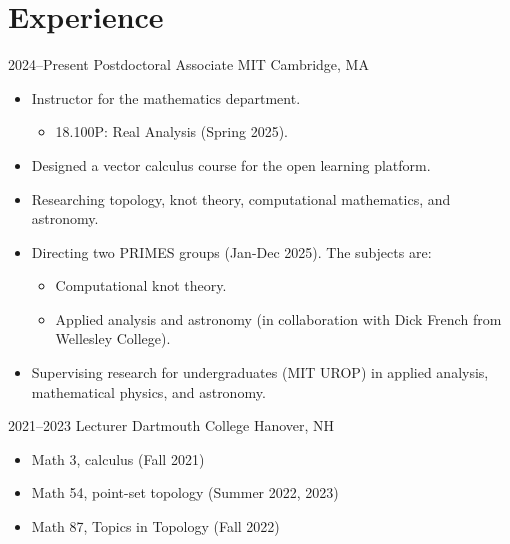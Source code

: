 \documentclass[a4paper,sans]{moderncv}
\begin{document}
    \section{Experience}
        \cventry%
            {2024--Present}
                {Postdoctoral Associate}
                {MIT}
                {Cambridge, MA}
                {}
                {%
                    \begin{itemize}
                        \item
                            Instructor for the mathematics department.
                            \begin{itemize}
                                \item
                                    18.100P: Real Analysis (Spring 2025).
                            \end{itemize}
                        \item
                            Designed a vector calculus course for the
                            open learning platform.
                        \item
                            Researching topology, knot theory,
                            computational mathematics, and astronomy.
                        \item
                            Directing two PRIMES groups (Jan-Dec 2025). The
                            subjects are:
                            \begin{itemize}
                                \item
                                    Computational knot theory.
                                \item
                                    Applied analysis and astronomy
                                    (in collaboration with Dick French
                                    from Wellesley College).
                            \end{itemize}
                        \item
                            Supervising research for undergraduates
                            (MIT UROP) in applied analysis,
                            mathematical physics, and astronomy.
                    \end{itemize}
                }
        \cventry%
            {2021--2023}
            {Lecturer}
            {Dartmouth College}
            {Hanover, NH}
            {}
            {%
                \begin{itemize}
                    \item Math 3, calculus (Fall 2021)
                    \item Math 54, point-set topology (Summer 2022, 2023)
                    \item Math 87, Topics in Topology (Fall 2022)
                \end{itemize}
            }
\end{document}
